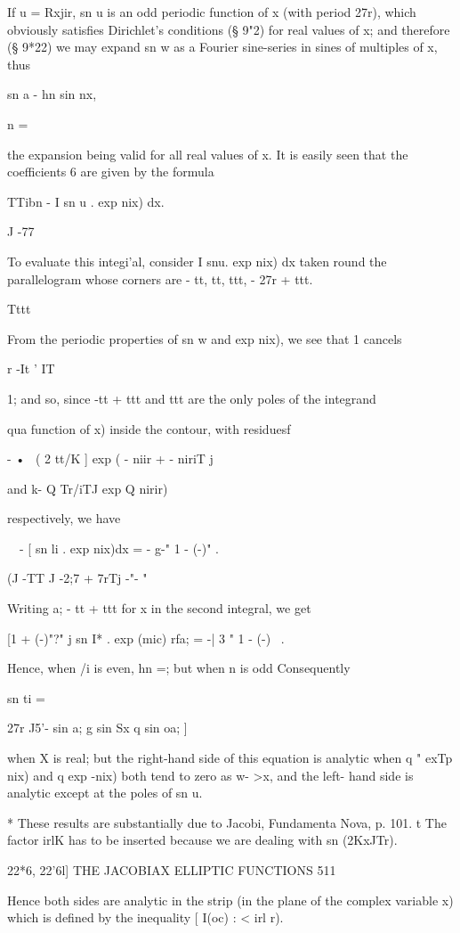If u = Rxjir, sn u is an odd periodic function of x (with period 27r),
which obviously satisfies Dirichlet's conditions (§ 9"2) for real
values of x; and therefore (§ 9*22) we may expand sn w as a Fourier
sine-series in sines of multiples of x, thus

sn a - hn sin nx,

n = \

the expansion being valid for all real values of x. It is easily seen
that the coefficients 6 are given by the formula

TTibn - I sn u . exp nix) dx.

J -77

To evaluate this integi'al, consider I snu. exp nix) dx taken round
the parallelogram whose corners are - tt, tt, ttt, - 27r + ttt.

Tttt

From the periodic properties of sn w and exp nix), we see that 1
cancels

r -It ' IT

1; and so, since -tt + ttt and ttt are the only poles of the
integrand

 qua function of x) inside the contour, with residuesf

- •~ ( 2 tt/K ] exp ( - niir + - niriT j

and k- Q Tr/iTJ exp Q nirir)

respectively, we have

\ \ - [ sn li . exp nix)dx = - g-" 1 - (-)" .

(J -TT J -2;7 + 7rTj -"- "

Writing a; - tt + ttt for x in the second integral, we get

[1 + (-)"?" j sn I* . exp (mic) rfa; = -| 3 " 1 - (-)~ .

Hence, when /i is even, hn =; but when n is odd Consequently

sn ti =

27r J5'- sin a; g sin Sx q sin oa; ]

when X is real; but the right-hand side of this equation is analytic
when q " exTp nix) and q exp -nix) both tend to zero as w- >x, and the
left- hand side is analytic except at the poles of sn u.

* These results are substantially due to Jacobi, Fundamenta Nova, p.
101. t The factor irlK has to be inserted because we are dealing with
sn (2KxJTr).

22*6, 22'6l] THE JACOBIAX ELLIPTIC FUNCTIONS 511

Hence both sides are analytic in the strip (in the plane of the
complex variable x) which is defined by the inequality [ I(oc) : < irl
r).

